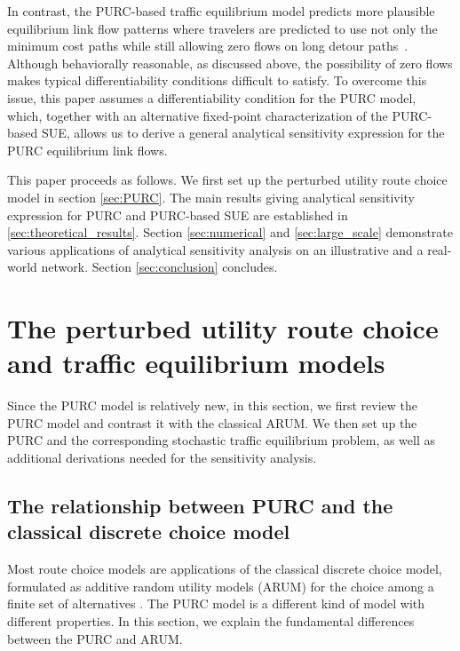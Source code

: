 \documentclass[a4paper,11pt]{article}
\begin{document}
In contrast, the PURC-based traffic equilibrium model predicts more plausible equilibrium link flow patterns where travelers are predicted to use not only the minimum cost paths while still allowing zero flows on long detour paths~\citep{Fosgerau2021a,fosgerau_bikeability_2023,yao_perturbed_2024}. Although behaviorally reasonable, as discussed above, the possibility of zero flows makes typical differentiability conditions difficult to satisfy. To overcome this issue, this paper assumes a differentiability condition for the PURC model, which, together with an alternative fixed-point characterization of the PURC-based SUE, allows us to derive a general analytical sensitivity expression for the PURC equilibrium link flows.

This paper proceeds as follows. We first set up the perturbed utility route choice model in section \ref{sec:PURC}. The main results giving analytical sensitivity expression for PURC and PURC-based SUE are established in \ref{sec:theoretical_results}. Section \ref{sec:numerical} and \ref{sec:large_scale} demonstrate various applications of analytical sensitivity analysis on an illustrative and a real-world network. Section \ref{sec:conclusion} concludes.





\section{The perturbed utility route choice and traffic equilibrium models\label{sec:PURC}}

Since the PURC model is relatively new, in this section, we first review the PURC model and contrast it with the classical ARUM. We then set up the PURC and the corresponding stochastic traffic equilibrium problem, as well as additional derivations needed for the sensitivity analysis.

\subsection{The relationship between PURC and the classical discrete choice model}

Most route choice models are applications of the classical discrete choice model, formulated as additive random utility models (ARUM) for the choice among a finite set of alternatives \citep{mcfadden_econometric_1981}.  The PURC model is a different kind of model with different properties. In this section, we explain the fundamental differences between the PURC and ARUM.
\end{document}
